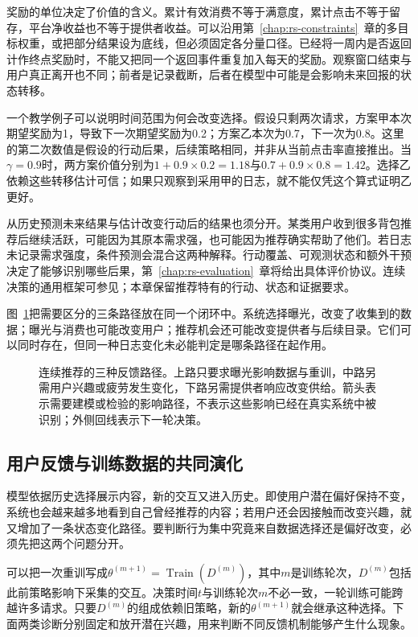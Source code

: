 奖励的单位决定了价值的含义。累计有效消费不等于满意度，累计点击不等于留存，平台净收益也不等于提供者收益。可以沿用第~\ref{chap:rs-constraints}~章的多目标权重，或把部分结果设为底线，但必须固定各分量口径。已经将一周内是否返回计作终点奖励时，不能又把同一个返回事件重复加入每天的奖励。观察窗口结束与用户真正离开也不同；前者是记录截断，后者在模型中可能是会影响未来回报的状态转移。

一个教学例子可以说明时间范围为何会改变选择。假设只剩两次请求，方案甲本次期望奖励为1，导致下一次期望奖励为0.2；方案乙本次为0.7，下一次为0.8。这里的第二次数值是假设的行动后果，后续策略相同，并非从当前点击率直接推出。当$\gamma=0.9$时，两方案价值分别为$1+0.9\times0.2=1.18$与$0.7+0.9\times0.8=1.42$。选择乙依赖这些转移估计可信；如果只观察到采用甲的日志，就不能仅凭这个算式证明乙更好。

从历史预测未来结果与估计改变行动后的结果也须分开。某类用户收到很多背包推荐后继续活跃，可能因为其原本需求强，也可能因为推荐确实帮助了他们。若日志未记录需求强度，条件预测会混合这两种解释。行动覆盖、可观测状态和额外干预决定了能够识别哪些后果，第~\ref{chap:rs-evaluation}~章将给出具体评价协议。连续决策的通用框架可参见；本章保留推荐特有的行动、状态和证据要求。

图~\ref{fig:rs-long-term-feedback}把需要区分的三条路径放在同一个闭环中。系统选择曝光，改变了收集到的数据；曝光与消费也可能改变用户；推荐机会还可能改变提供者与后续目录。它们可以同时存在，但同一种日志变化未必能判定是哪条路径在起作用。

\begin{figure}[htbp]
 \centering
 
 \caption{连续推荐的三种反馈路径。上路只要求曝光影响数据与重训，中路另需用户兴趣或疲劳发生变化，下路另需提供者响应改变供给。箭头表示需要建模或检验的影响路径，不表示这些影响已经在真实系统中被识别；外侧回线表示下一轮决策。}
 \label{fig:rs-long-term-feedback}
\end{figure}

\subsection{用户反馈与训练数据的共同演化}
\label{sec:rs-user-data-coevolution}

模型依据历史选择展示内容，新的交互又进入历史。即使用户潜在偏好保持不变，系统也会越来越多地看到自己曾经推荐的内容；若用户还会因接触而改变兴趣，就又增加了一条状态变化路径。要判断行为集中究竟来自数据选择还是偏好改变，必须先把这两个问题分开。

可以把一次重训写成$\theta^{(m+1)}=\operatorname{Train}(D^{(m)})$，其中$m$是训练轮次，$D^{(m)}$包括此前策略影响下采集的交互。决策时间$t$与训练轮次$m$不必一致，一轮训练可能跨越许多请求。只要$D^{(m)}$的组成依赖旧策略，新的$\theta^{(m+1)}$就会继承这种选择。下面两类诊断分别固定和放开潜在兴趣，用来判断不同反馈机制能够产生什么现象。

